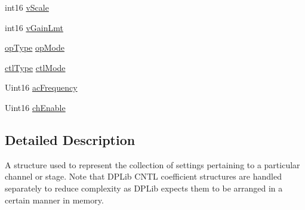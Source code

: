 \begin{DoxyCompactItemize}
\item 
int16 \hyperlink{structchannel_parameters_a7bdcae99eedfaaa8bfda6088cec1c08d}{v\-Scale}
\item 
int16 \hyperlink{structchannel_parameters_a7dd5ddd959b3f3344721e729e51f0db5}{v\-Gain\-Lmt}
\item 
\hyperlink{_macro_nets_8h_acd90d47e6937efc4183ab0d18f787575}{op\-Type} \hyperlink{structchannel_parameters_a25d490fa4d7487c8e2e21c1400a6b99b}{op\-Mode}
\item 
\hyperlink{_macro_nets_8h_a5cd368998e9721e657fd7bc6d413807a}{ctl\-Type} \hyperlink{structchannel_parameters_ab31dab8e873272dd15641943b20e56a5}{ctl\-Mode}
\item 
Uint16 \hyperlink{structchannel_parameters_a817bac18060f842dca3867eeb7e2d06c}{ac\-Frequency}
\item 
Uint16 \hyperlink{structchannel_parameters_af99576e00746544eab1d4e88d12f39b4}{ch\-Enable}
\end{DoxyCompactItemize}


\subsection{Detailed Description}
A structure used to represent the collection of settings pertaining to a particular channel or stage. Note that D\-P\-Lib C\-N\-T\-L coefficient structures are handled separately to reduce complexity as D\-P\-Lib expects them to be arranged in a certain manner in memory. 

